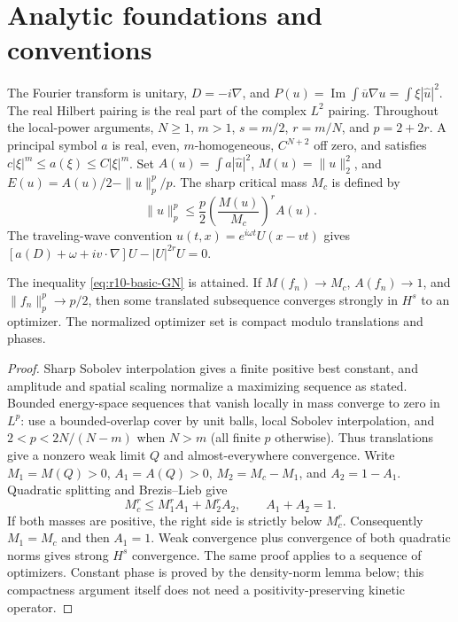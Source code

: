 \section{Analytic foundations and conventions}
\label{sec:r10-foundations}
The Fourier transform is unitary, $D=-i\nabla$, and
$P(u)=\operatorname{Im}\int\overline u\nabla u=\int\xi|\widehat u|^2$.
The real Hilbert pairing is the real part of the complex $L^2$ pairing.
Throughout the local-power arguments, $N\ge1$, $m>1$, $s=m/2$,
$r=m/N$, and $p=2+2r$. A principal symbol $a$ is real, even,
$m$-homogeneous, $C^{N+2}$ off zero, and satisfies
$c|\xi|^m\le a(\xi)\le C|\xi|^m$.
Set $A(u)=\int a|\widehat u|^2$, $M(u)=\|u\|_2^2$, and
$E(u)=A(u)/2-\|u\|_p^p/p$. The sharp critical mass $M_c$ is defined by
\begin{equation}\label{eq:r10-basic-GN}
 \|u\|_p^p\le\frac p2\left(\frac{M(u)}{M_c}\right)^r A(u).
\end{equation}
The traveling-wave convention $u(t,x)=e^{i\omega t}U(x-vt)$ gives
$[a(D)+\omega+iv\cdot\nabla]U-|U|^{2r}U=0$.

\begin{lemma}
The inequality \eqref{eq:r10-basic-GN} is attained. If
$M(f_n)\to M_c$, $A(f_n)\to1$, and $\|f_n\|_p^p\to p/2$, then
some translated subsequence converges strongly in $H^s$ to an optimizer.
The normalized optimizer set is compact modulo translations and phases.
\end{lemma}
\begin{proof}
Sharp Sobolev interpolation gives a finite positive best constant, and
amplitude and spatial scaling normalize a maximizing sequence as stated.
Bounded energy-space sequences that vanish locally in mass converge to
zero in $L^p$: use a bounded-overlap cover by unit balls, local Sobolev
interpolation, and $2<p<2N/(N-m)$ when $N>m$ (all finite $p$ otherwise).
Thus translations give a nonzero weak limit $Q$ and almost-everywhere
convergence. Write $M_1=M(Q)>0$, $A_1=A(Q)>0$, $M_2=M_c-M_1$,
and $A_2=1-A_1$. Quadratic splitting and Brezis--Lieb give
\[
 M_c^r\le M_1^r A_1+M_2^r A_2,\qquad A_1+A_2=1.
\]
If both masses are positive, the right side is strictly below $M_c^r$.
Consequently $M_1=M_c$ and then $A_1=1$. Weak convergence plus
convergence of both quadratic norms gives strong $H^s$ convergence.
The same proof applies to a sequence of optimizers. Constant phase is
proved by the density-norm lemma below; this compactness argument itself
does not need a positivity-preserving kinetic operator.
\end{proof}


